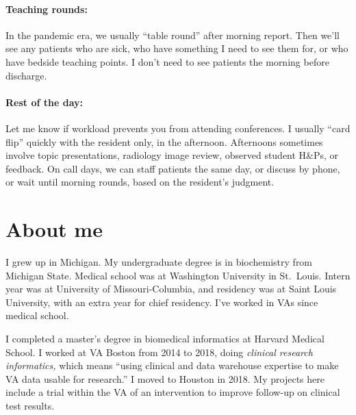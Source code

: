 \documentclass{tufte-handout}
\begin{document}
\paragraph{Teaching rounds:} In the pandemic era, we usually ``table
round'' after morning report. Then we'll see any patients who are
sick, who have something I need to see them for, or who have bedside
teaching points. I don't need to see patients the morning before
discharge.

\paragraph{Rest of the day:} Let me know if workload prevents you from
attending conferences. I usually ``card flip'' quickly with the
resident only, in the afternoon. Afternoons sometimes involve topic
presentations, radiology image review, observed student H\&Ps, or
feedback. On call days, we can staff patients the same day, or discuss
by phone, or wait until morning rounds, based on the resident's
judgment.

\section{About me}

I grew up in Michigan. My undergraduate degree is in biochemistry from
Michigan State. Medical school was at Washington University in
St.\ Louis. Intern year was at University of Missouri-Columbia, and
residency was at Saint Louis University, with an extra year for chief
residency. I've worked in VAs since medical school.

I completed a master's degree in biomedical informatics at Harvard
Medical School. I worked at VA Boston from 2014 to 2018, doing
\emph{clinical research informatics,} which means ``using clinical and
data warehouse expertise to make VA data usable for
research.'' I moved to Houston in 2018. My projects here
include a trial within the VA of an intervention to improve follow-up
on clinical test results.
\end{document}
